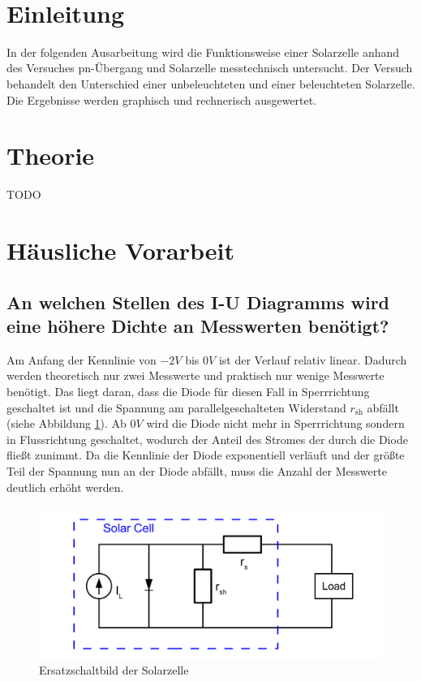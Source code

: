 \documentclass[a4paper]{scrartcl}
\def\header#1#2{
  \begin{center}
    {\Large #1}\\
    {#2}
  \end{center}
}
\numberwithin{equation}{subsection}
\begin{document}
\vspace{10pt}
\header{\HEADDING}{\SUBHEADDING}

\tableofcontents

\newpage

\section{Einleitung}
In der folgenden Ausarbeitung wird die Funktionsweise einer Solarzelle anhand des Versuches
\glqq pn-Übergang und Solarzelle\grqq \hspace{0cm} messtechnisch untersucht. Der Versuch behandelt
den Unterschied einer unbeleuchteten und einer beleuchteten Solarzelle. Die Ergebnisse werden graphisch
und rechnerisch ausgewertet.
\newpage
\section{Theorie}
TODO

\newpage
\section{Häusliche Vorarbeit}
\subsection{An welchen Stellen des I-U Diagramms wird eine höhere Dichte an Messwerten benötigt?}
Am Anfang der Kennlinie von $-2V$ bis $0V$ ist der Verlauf relativ linear. Dadurch werden theoretisch nur
zwei Messwerte und praktisch nur wenige Messwerte benötigt. Das liegt daran, dass die Diode für diesen
Fall in Sperrrichtung geschaltet ist und die Spannung am parallelgeschalteten Widerstand $r_{\text{sh}}$
abfällt (siehe Abbildung \ref{fig:ESB_Solar}). Ab $0V$ wird die Diode nicht mehr in Sperrrichtung sondern
in Flussrichtung geschaltet, wodurch der Anteil des Stromes der durch die Diode fließt zunimmt.
Da die Kennlinie der Diode exponentiell verläuft und der größte Teil der Spannung nun an der Diode
abfällt, muss die Anzahl der Messwerte deutlich erhöht werden.

\begin{figure}[H]
\includegraphics[width=16cm]{ESB_Solarzelle}
\centering
\caption{Ersatzschaltbild der Solarzelle}
\centering
\label{fig:ESB_Solar}
\end{figure}
\end{document}
